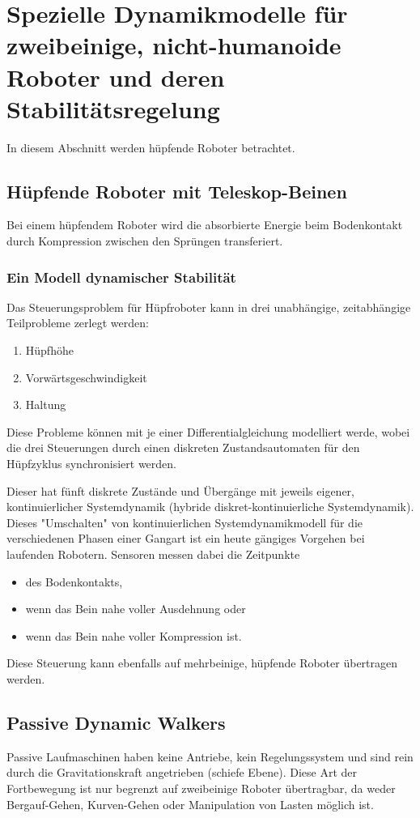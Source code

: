 	\section{Spezielle Dynamikmodelle für zweibeinige, nicht-humanoide Roboter und deren Stabilitätsregelung}
		In diesem Abschnitt werden \zB hüpfende Roboter betrachtet.

		\subsection{Hüpfende Roboter mit Teleskop-Beinen}
			Bei einem hüpfendem Roboter wird die absorbierte Energie beim Bodenkontakt durch Kompression zwischen den Sprüngen transferiert.

			\subsubsection{Ein Modell dynamischer Stabilität}
				Das Steuerungsproblem für Hüpfroboter kann in drei unabhängige, zeitabhängige Teilprobleme zerlegt werden:
				\begin{enumerate}
					\item Hüpfhöhe
					\item Vorwärtsgeschwindigkeit
					\item Haltung
				\end{enumerate}
				Diese Probleme können mit je einer Differentialgleichung modelliert werde, wobei die drei Steuerungen durch einen diskreten Zustandsautomaten für den Hüpfzyklus synchronisiert werden.

				Dieser hat fünft diskrete Zustände und Übergänge mit jeweils eigener, kontinuierlicher Systemdynamik (hybride diskret-kontinuierliche Systemdynamik). Dieses "Umschalten" von kontinuierlichen Systemdynamikmodell für die verschiedenen Phasen einer Gangart ist ein heute gängiges Vorgehen bei laufenden Robotern. Sensoren messen dabei die Zeitpunkte
				\begin{itemize}
					\item des Bodenkontakts,
					\item wenn das Bein nahe voller Ausdehnung oder
					\item wenn das Bein nahe voller Kompression ist.
				\end{itemize}
				Diese Steuerung kann ebenfalls auf mehrbeinige, hüpfende Roboter übertragen werden.

		\subsection{Passive Dynamic Walkers}
			Passive Laufmaschinen haben keine Antriebe, kein Regelungssystem und sind rein durch die Gravitationskraft angetrieben (schiefe Ebene). Diese Art der Fortbewegung ist nur begrenzt auf zweibeinige Roboter übertragbar, da weder Bergauf-Gehen, Kurven-Gehen oder Manipulation von Lasten möglich ist.

